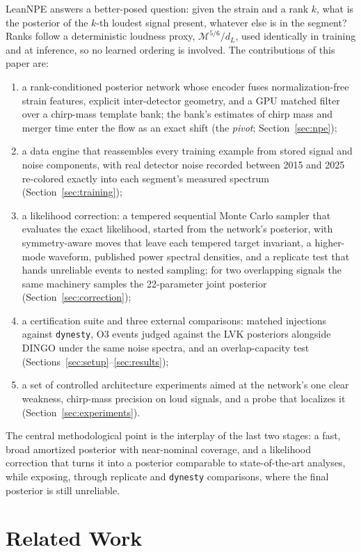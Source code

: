 \documentclass[twocolumn,linenumbers]{aastex701}
\begin{document}
LeanNPE answers a better-posed question: given the strain and a rank $k$, what
is the posterior of the $k$-th loudest signal present, whatever else is in the
segment? Ranks follow a deterministic loudness proxy, $\mathcal{M}^{5/6}/d_L$,
used identically in training and at inference, so no learned ordering is
involved. The contributions of this paper are:
\begin{enumerate}
\item a rank-conditioned posterior network whose encoder fuses
  normalization-free strain features, explicit inter-detector geometry, and a
  GPU matched filter over a chirp-mass template bank; the bank's estimates of
  chirp mass and merger time enter the flow as an exact shift (the
  \emph{pivot}; Section~\ref{sec:npe});
\item a data engine that reassembles every training example from stored
  signal and noise components, with real detector noise recorded between 2015 and 2025 re-colored
  exactly into each segment's measured spectrum (Section~\ref{sec:training});
\item a likelihood correction: a tempered sequential Monte Carlo sampler
  that evaluates the exact likelihood, started from the network's posterior,
  with symmetry-aware moves that leave each tempered target invariant, a
  higher-mode waveform, published power spectral densities, and a replicate
  test that hands unreliable events to nested sampling; for two overlapping
  signals the same machinery samples the 22-parameter joint posterior
  (Section~\ref{sec:correction});
\item a certification suite and three external comparisons: matched
  injections against \texttt{dynesty}, O3 events judged against the LVK
  posteriors alongside DINGO under the same noise spectra, and an
  overlap-capacity test
  (Sections~\ref{sec:setup}--\ref{sec:results});
\item a set of controlled architecture experiments aimed at the network's one
  clear weakness, chirp-mass precision on loud signals, and a probe that
  localizes it (Section~\ref{sec:experiments}).
\end{enumerate}
The central methodological point is the interplay of the last two stages: a
fast, broad amortized posterior with near-nominal coverage, and a likelihood correction
that turns it into a posterior comparable to state-of-the-art analyses, while
exposing, through replicate and \texttt{dynesty} comparisons, where the final
posterior is still unreliable.

\section{Related Work} \label{sec:related}
\end{document}
